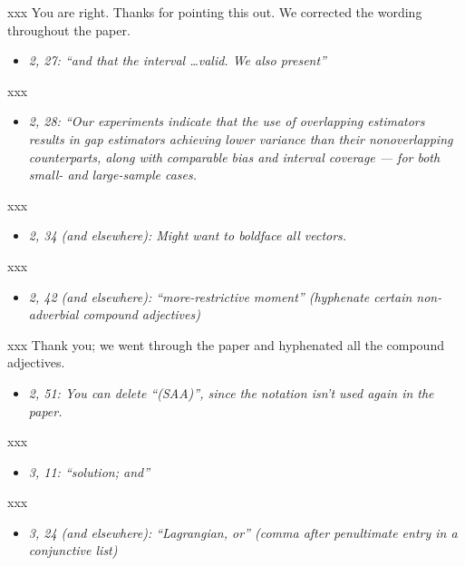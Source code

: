 \documentclass[11pt,notitlepage,onecolumn]{article}
\newcommand{\noi}{\noindent}
\begin{document}
\noi
xxx  You are right. 
Thanks for pointing this out. We corrected the wording throughout the paper. 
\medskip 


\begin{itemize}
\item[] \textit{2, 27: ``and that the interval \ldots valid. 
We also present''}
\end{itemize}

\noi
xxx  
\medskip 


\begin{itemize}
\item[] \textit{2, 28: ``Our experiments indicate that the use of overlapping estimators results in gap estimators achieving lower variance than their nonoverlapping counterparts, along with comparable bias and interval coverage --- for both small- and large-sample cases.}
\end{itemize}

\noi
xxx  
\medskip 


\begin{itemize}
\item[] \textit{2, 34 (and elsewhere): Might want to boldface all vectors.}
\end{itemize}

\noi
xxx  
\medskip 


\begin{itemize}
\item[] \textit{2, 42 (and elsewhere): ``more-restrictive moment'' (hyphenate certain non-adverbial compound adjectives)}
\end{itemize}

\noi
xxx  Thank you; we went through the paper and hyphenated all the compound adjectives.
\medskip 


\begin{itemize}
\item[] \textit{2, 51: You can delete ``(SAA)'', since the notation isn't used again in the paper.}
\end{itemize}

\noi
xxx  
\medskip 


\begin{itemize}
\item[] \textit{3, 11: ``solution; and''}
\end{itemize}

\noi
xxx  
\medskip 


\begin{itemize}
\item[] \textit{3, 24 (and elsewhere): ``Lagrangian, or'' (comma after penultimate entry in a conjunctive list)}
\end{itemize}
\end{document}
